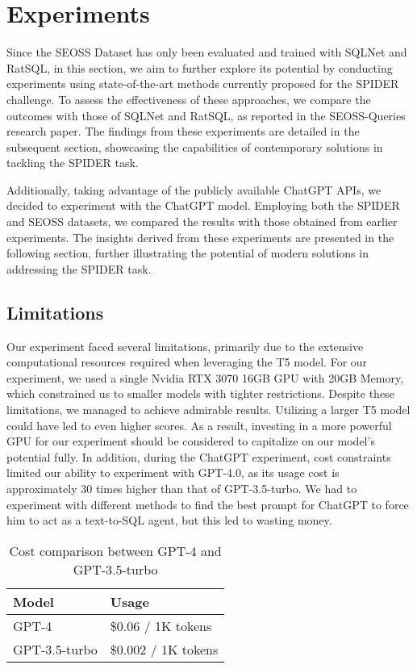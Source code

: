 \section{Experiments}

Since the SEOSS Dataset\cite{RATH2019104005} has only been evaluated and trained with SQLNet and RatSQL, in this section, we aim to further explore its potential by conducting experiments using state-of-the-art methods currently proposed for the SPIDER challenge. To assess the effectiveness of these approaches, we compare the outcomes with those of SQLNet and RatSQL, as reported in the SEOSS-Queries research paper\cite{TOMOVA2022108211}. The findings from these experiments are detailed in the subsequent section, showcasing the capabilities of contemporary solutions in tackling the SPIDER task.

Additionally, taking advantage of the publicly available ChatGPT APIs, we decided to experiment with the ChatGPT model. Employing both the SPIDER and SEOSS datasets, we compared the results with those obtained from earlier experiments. The insights derived from these experiments are presented in the following section, further illustrating the potential of modern solutions in addressing the SPIDER task.

\subsection{Limitations}

Our experiment faced several limitations, primarily due to the extensive computational resources required when leveraging the T5 model. For our experiment, we used a single Nvidia RTX 3070 16GB GPU with 20GB Memory, which constrained us to smaller models with tighter restrictions. Despite these limitations, we managed to achieve admirable results. Utilizing a larger T5 model could have led to even higher scores. As a result, investing in a more powerful GPU for our experiment should be considered to capitalize on our model's potential fully.
In addition, during the ChatGPT experiment, cost constraints limited our ability to experiment with GPT-4.0, as its usage cost is approximately 30 times higher than that of GPT-3.5-turbo. We had to experiment with different methods to find the best prompt for ChatGPT to force him to act as a text-to-SQL agent, but this led to wasting money.

\begin{table}[H]
    \centering
    \begin{tabular}{|l|l|}
        \hline \textbf{Model} & \textbf{Usage}      \\
        \hline GPT-4          & \$0.06 / 1K tokens  \\
        \hline GPT-3.5-turbo  & \$0.002 / 1K tokens \\
        \hline
    \end{tabular}
    \caption{Cost comparison between GPT-4 and GPT-3.5-turbo}
    \label{tab:cost_comparison}
\end{table}



\clearpage


\clearpage
